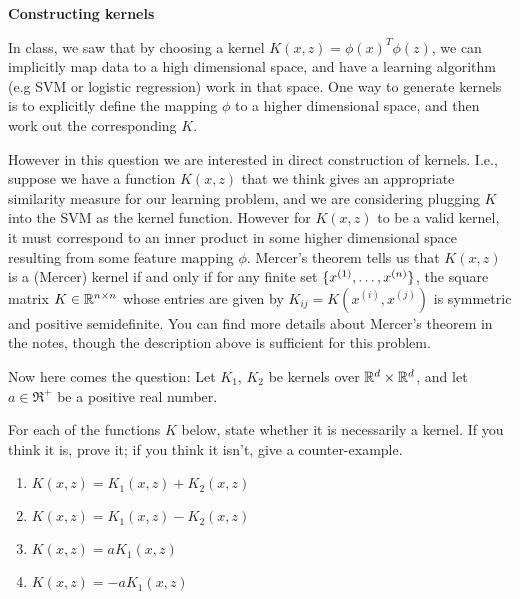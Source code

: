 \item {\bf Constructing kernels}

In class, we saw that by choosing a kernel $K(x,z) = \phi(x)^T\phi(z)$, we can
implicitly map data to a high dimensional space, and have a learning algorithm (e.g SVM or logistic regression)
work in that space. One way to generate kernels is to explicitly define the
mapping $\phi$ to a higher dimensional space, and then work out the
corresponding $K$.

However in this question we are interested in direct construction of kernels.
I.e., suppose we have a function $K(x,z)$ that we think gives an appropriate
similarity measure for our learning problem, and we are considering plugging
$K$ into the SVM as the kernel function. However for $K(x,z)$ to be a valid
kernel, it must correspond to an inner product in some higher dimensional space
resulting from some feature mapping $\phi$.  Mercer's theorem tells us that
$K(x,z)$ is a (Mercer) kernel if and only if for any finite set $\{x^{(1)},
\ldots, x^{({n})}\}$, the square matrix $K \in \mathbb{R}^{{n} \times {n}}$ whose entries
are given by $K_{ij} = K(x^{(i)},x^{(j)})$ is symmetric and positive
semidefinite. You can find more details about Mercer's theorem in the notes,
though the description above is sufficient for this problem.

Now here comes the question: Let $K_1$, $K_2$ be kernels over $\mathbb{R}^{{d}} \times
\mathbb{R}^{{d}}$, and let $a \in \Re^+$ be a positive real number.

For each of the functions $K$ below, state whether it is necessarily a
kernel.  If you think it is, prove it; if you think it isn't, give a
counter-example.

\begin{enumerate}

\item {} $K(x,z) = K_1(x,z) + K_2(x,z)$
\item {} $K(x,z) = K_1(x,z) - K_2(x,z)$
\item {} $K(x,z) = a K_1(x,z)$
\item {} $K(x,z) = -a K_1(x,z)$

\end{enumerate}